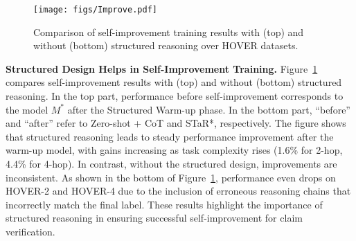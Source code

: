 \begin{figure}[t]
  \texttt{[image: figs/Improve.pdf]}
  \caption{Comparison of self-improvement training results with (top) and without (bottom) structured reasoning over HOVER datasets.}
  \label{fig:improve}
\end{figure}

\textbf{Structured Design Helps in Self-Improvement Training.}\xspace 
Figure~\ref{fig:improve} compares self-improvement results with (top) and without (bottom) structured reasoning. In the top part, performance before self-improvement corresponds to the model $M^*$ after the Structured Warm-up phase. In the bottom part, ``before'' and ``after'' refer to Zero-shot + CoT and STaR*, respectively. The figure shows that structured reasoning leads to steady performance improvement after the warm-up model, with gains increasing as task complexity rises (1.6\% for 2-hop, 4.4\% for 4-hop). In contrast, without the structured design, improvements are inconsistent. As shown in the bottom of Figure~\ref{fig:improve}, performance even drops on HOVER-2 and HOVER-4 due to the inclusion of erroneous reasoning chains that incorrectly match the final label. These results highlight the importance of structured reasoning in ensuring successful self-improvement for claim verification.


